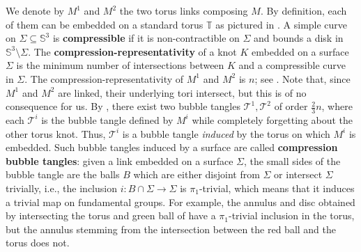 \documentclass{article}
\newcommand{\To}{\mathbb{T}}
\newcommand{\T}{\mathcal{T}}
\begin{document}
We denote by $M^1$ and $M^2$ the two torus links composing $M$.
By definition, each of them can be embedded on a standard torus $\To$ as pictured in . A simple curve on $\Sigma \subseteq \mathbb{S}^3$ is \textbf{compressible} if it is non-contractible on $\Sigma$ and bounds a disk in $\mathbb{S}^3\setminus \Sigma$. The \textbf{compression-representativity} of a knot $K$ embedded on a surface $\Sigma$ is the minimum number of intersections between $K$ and a compressible curve in $\Sigma$. The compression-representativity of $M^1$ and $M^2$ is $n$; see \cite[Section~5]{Lunel_spherewidth_out}. Note that, since $M^1$ and $M^2$ are linked, their underlying tori intersect, but this is of no consequence for us. By \cite[Theorem~1.2]{Lunel_spherewidth_out}, there exist two bubble tangles $\T^1, \T^2$ of order $\frac{2}{3}n$, where each $\T^i$ is the bubble tangle defined by $M^i$ while completely forgetting about the other torus knot. Thus, $\T^i$ is a bubble tangle \emph{induced} by the torus on which $M^i$ is embedded. Such bubble tangles induced by a surface are called \textbf{compression bubble tangles}: given a link embedded on a surface $\Sigma$, the small sides of the bubble tangle are the balls $B$ which are either disjoint from $\Sigma$ or intersect $\Sigma$ trivially, i.e., the inclusion $i: B \cap \Sigma \rightarrow \Sigma$ is $\pi_1$-trivial, which means that it induces a trivial map on fundamental groups. For example, the annulus and disc obtained by intersecting the torus and green ball of  have a $\pi_1$-trivial inclusion in the torus, but the annulus stemming from the intersection between the red ball and the torus does not.
\end{document}
